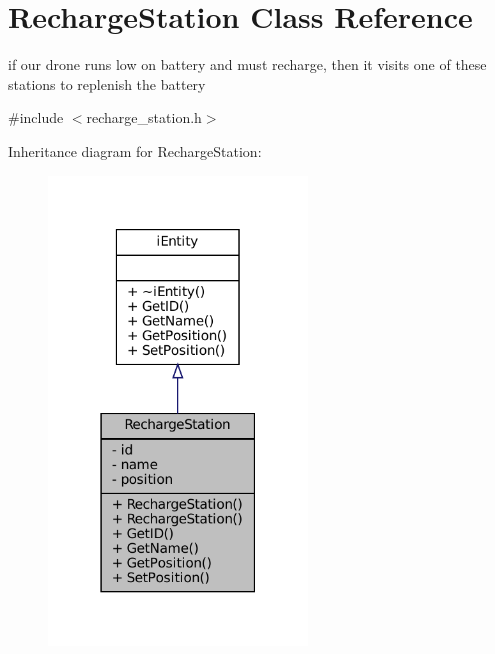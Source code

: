 \hypertarget{classRechargeStation}{}\section{Recharge\+Station Class Reference}
\label{classRechargeStation}


if our drone runs low on battery and must recharge, then it visits one of these stations to replenish the battery  




{\ttfamily \#include $<$recharge\+\_\+station.\+h$>$}



Inheritance diagram for Recharge\+Station\+:\nopagebreak
\begin{figure}[H]
\begin{center}
\leavevmode
\includegraphics[width=195pt]{classRechargeStation__inherit__graph}
\end{center}
\end{figure}


